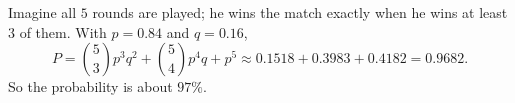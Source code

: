 Imagine all $5$ rounds are played; he wins the match exactly when he wins at least $3$ of them. With $p=0.84$ and $q=0.16$,
\[P=\binom53p^3q^2+\binom54p^4q+p^5\approx0.1518+0.3983+0.4182=0.9682.\]
So the probability is about $\boxed{97\%}$.
